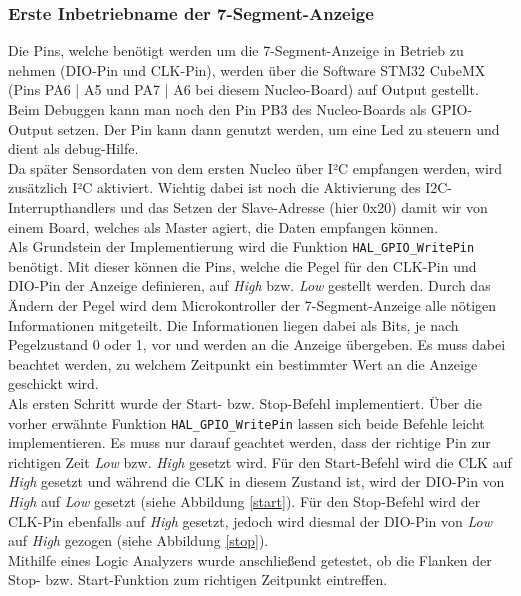 \documentclass[11pt,a4paper,titlepage]{article}
\begin{document}
\subsubsection{Erste Inbetriebname der 7-Segment-Anzeige}

Die Pins, welche benötigt werden um die 7-Segment-Anzeige in Betrieb zu nehmen (DIO-Pin und CLK-Pin),
werden über die Software STM32 CubeMX (Pins PA6 | A5 und PA7 | A6 bei diesem Nucleo-Board) auf Output gestellt.
Beim Debuggen kann man noch den Pin PB3 des Nucleo-Boards als GPIO-Output setzen.
Der Pin kann dann genutzt werden, um eine Led zu steuern und dient als debug-Hilfe.\\

Da später Sensordaten von dem ersten Nucleo über I²C empfangen werden, wird zusätzlich I²C aktiviert.
Wichtig dabei ist noch die Aktivierung des I2C-Interrupthandlers und das Setzen der Slave-Adresse (hier 0x20) damit wir von einem Board,
welches als Master agiert, die Daten empfangen können.\\

Als Grundstein der Implementierung wird die Funktion \texttt{HAL\_GPIO\_WritePin} benötigt.
Mit dieser können die Pins, welche die Pegel für den CLK-Pin und DIO-Pin der Anzeige definieren,
auf \textit{High} bzw. \textit{Low} gestellt werden.
Durch das Ändern der Pegel wird dem Microkontroller der 7-Segment-Anzeige alle nötigen Informationen mitgeteilt.
Die Informationen liegen dabei als Bits, je nach Pegelzustand 0 oder 1, vor und werden an die Anzeige übergeben.
Es muss dabei beachtet werden, zu welchem Zeitpunkt ein bestimmter Wert an die Anzeige geschickt wird.\\

Als ersten Schritt wurde der Start- bzw. Stop-Befehl implementiert.
Über die vorher erwähnte Funktion \texttt{HAL\_GPIO\_WritePin} lassen sich beide Befehle leicht implementieren.
Es muss nur darauf geachtet werden, dass der richtige Pin zur richtigen Zeit \textit{Low} bzw. \textit{High} gesetzt wird.
Für den Start-Befehl wird die CLK auf \textit{High} gesetzt und während die CLK in diesem Zustand ist,
wird der DIO-Pin von \textit{High} auf \textit{Low} gesetzt (siehe Abbildung \ref{start}).
Für den Stop-Befehl wird der CLK-Pin ebenfalls auf \textit{High} gesetzt,
jedoch wird diesmal der DIO-Pin von \textit{Low} auf \textit{High} gezogen (siehe Abbildung \ref{stop}).\\
Mithilfe eines Logic Analyzers wurde anschließend getestet, ob die Flanken der Stop- bzw. Start-Funktion zum richtigen Zeitpunkt eintreffen.\\
\end{document}

